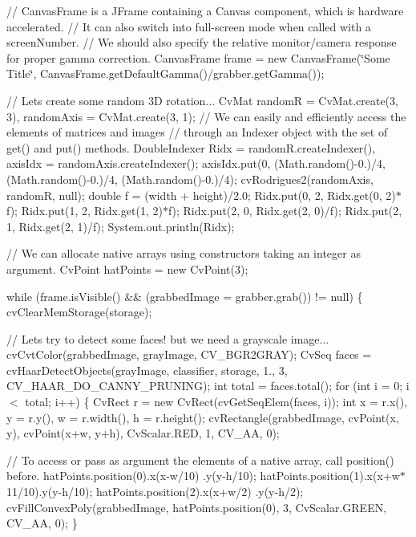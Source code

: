 // Canvas\+Frame is a J\+Frame containing a Canvas component, which is hardware accelerated. // It can also switch into full-\/screen mode when called with a screen\+Number. // We should also specify the relative monitor/camera response for proper gamma correction. Canvas\+Frame frame = new Canvas\+Frame(\char`\"{}\+Some Title\char`\"{}, Canvas\+Frame.\+get\+Default\+Gamma()/grabber.get\+Gamma());

// Let\textquotesingle{}s create some random 3\+D rotation... Cv\+Mat random\+R = Cv\+Mat.\+create(3, 3), random\+Axis = Cv\+Mat.\+create(3, 1); // We can easily and efficiently access the elements of matrices and images // through an Indexer object with the set of get() and put() methods. Double\+Indexer Ridx = random\+R.\+create\+Indexer(), axis\+Idx = random\+Axis.\+create\+Indexer(); axis\+Idx.\+put(0, (Math.\+random()-\/0.)/4, (Math.\+random()-\/0.)/4, (Math.\+random()-\/0.)/4); cv\+Rodrigues2(random\+Axis, random\+R, null); double f = (width + height)/2.0; Ridx.\+put(0, 2, Ridx.\+get(0, 2)$\ast$f); Ridx.\+put(1, 2, Ridx.\+get(1, 2)$\ast$f); Ridx.\+put(2, 0, Ridx.\+get(2, 0)/f); Ridx.\+put(2, 1, Ridx.\+get(2, 1)/f); System.\+out.\+println(\+Ridx);

// We can allocate native arrays using constructors taking an integer as argument. Cv\+Point hat\+Points = new Cv\+Point(3);

while (frame.\+is\+Visible() \&\& (grabbed\+Image = grabber.\+grab()) != null) \{ cv\+Clear\+Mem\+Storage(storage);

// Let\textquotesingle{}s try to detect some faces! but we need a grayscale image... cv\+Cvt\+Color(grabbed\+Image, gray\+Image, C\+V\+\_\+\+B\+G\+R2\+G\+R\+A\+Y); Cv\+Seq faces = cv\+Haar\+Detect\+Objects(gray\+Image, classifier, storage, 1., 3, C\+V\+\_\+\+H\+A\+A\+R\+\_\+\+D\+O\+\_\+\+C\+A\+N\+N\+Y\+\_\+\+P\+R\+U\+N\+I\+N\+G); int total = faces.\+total(); for (int i = 0; i $<$ total; i++) \{ Cv\+Rect r = new Cv\+Rect(cv\+Get\+Seq\+Elem(faces, i)); int x = r.\+x(), y = r.\+y(), w = r.\+width(), h = r.\+height(); cv\+Rectangle(grabbed\+Image, cv\+Point(x, y), cv\+Point(x+w, y+h), Cv\+Scalar.\+R\+E\+D, 1, C\+V\+\_\+\+A\+A, 0);

// To access or pass as argument the elements of a native array, call position() before. hat\+Points.\+position(0).x(x-\/w/10) .y(y-\/h/10); hat\+Points.\+position(1).x(x+w$\ast$11/10).y(y-\/h/10); hat\+Points.\+position(2).x(x+w/2) .y(y-\/h/2); cv\+Fill\+Convex\+Poly(grabbed\+Image, hat\+Points.\+position(0), 3, Cv\+Scalar.\+G\+R\+E\+E\+N, C\+V\+\_\+\+A\+A, 0); \}

